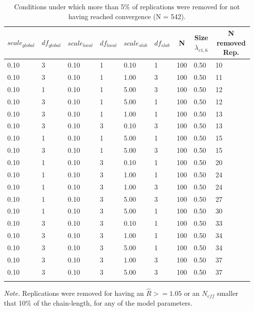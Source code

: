 \documentclass[
  man, donotrepeattitle,floatsintext]{apa6}
\begin{document}
\begin{table}[tbp]

\begin{center}
\begin{threeparttable}

\caption{\label{tab:unnamed-chunk-3}Conditions under which more than 5\% of replications were removed for not having reached convergence (N = 542).}

\begin{tabular}{lllllllll}
\toprule
$scale_{global}$ & \multicolumn{1}{c}{$df_{global}$} & \multicolumn{1}{c}{$scale_{local}$} & \multicolumn{1}{c}{$df_{local}$} & \multicolumn{1}{c}{$scale_{slab}$} & \multicolumn{1}{c}{$df_{slab}$} & \multicolumn{1}{c}{N} & \multicolumn{1}{c}{Size $\lambda_{c1 , 6}$} & \multicolumn{1}{c}{N removed Rep.}\\
\midrule
0.10 & 3 & 0.10 & 1 & 0.10 & 1 & 100 & 0.50 & 10\\
0.10 & 3 & 0.10 & 1 & 1.00 & 3 & 100 & 0.50 & 11\\
0.10 & 1 & 0.10 & 1 & 5.00 & 3 & 100 & 0.50 & 12\\
0.10 & 3 & 0.10 & 1 & 5.00 & 1 & 100 & 0.50 & 12\\
0.10 & 3 & 0.10 & 1 & 1.00 & 1 & 100 & 0.50 & 13\\
0.10 & 3 & 0.10 & 3 & 0.10 & 3 & 100 & 0.50 & 13\\
0.10 & 1 & 0.10 & 1 & 5.00 & 1 & 100 & 0.50 & 15\\
0.10 & 3 & 0.10 & 1 & 5.00 & 3 & 100 & 0.50 & 15\\
0.10 & 1 & 0.10 & 3 & 0.10 & 1 & 100 & 0.50 & 20\\
0.10 & 1 & 0.10 & 3 & 1.00 & 1 & 100 & 0.50 & 24\\
0.10 & 1 & 0.10 & 3 & 1.00 & 3 & 100 & 0.50 & 24\\
0.10 & 1 & 0.10 & 3 & 5.00 & 3 & 100 & 0.50 & 27\\
0.10 & 1 & 0.10 & 3 & 5.00 & 1 & 100 & 0.50 & 30\\
0.10 & 3 & 0.10 & 3 & 0.10 & 1 & 100 & 0.50 & 33\\
0.10 & 3 & 0.10 & 3 & 1.00 & 1 & 100 & 0.50 & 34\\
0.10 & 3 & 0.10 & 3 & 5.00 & 1 & 100 & 0.50 & 34\\
0.10 & 3 & 0.10 & 3 & 1.00 & 3 & 100 & 0.50 & 37\\
0.10 & 3 & 0.10 & 3 & 5.00 & 3 & 100 & 0.50 & 37\\
\bottomrule
\addlinespace
\end{tabular}

\begin{tablenotes}[para]
\normalsize{\textit{Note.} Replications were removed for having an $\hat{R} >= 1.05$ or an $N_{eff}$  smaller that 10\% of the chain-length, for any of the model parameters.}
\end{tablenotes}

\end{threeparttable}
\end{center}

\end{table}
\end{document}

